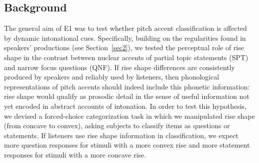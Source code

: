 \subsection{Background}\label{sec3200}
The general aim of E1 was to test whether pitch accent classification is affected by dynamic intonational cues. Specifically, building on the regularities found in speakers' productions (see Section~\ref{sec2}), we tested the perceptual role of rise shape in the contrast between nuclear accents of partial topic statements (SPT) and narrow focus questions (QNF). If rise shape differences are consistently produced by speakers and reliably used by listeners, then phonological representations of pitch accents should indeed include this phonetic information: rise shape would qualify as prosodic detail in the sense of useful information not yet encoded in abstract accounts of intonation. In order to test this hypothesis, we devised a forced-choice categorization task in which we manipulated rise shape (from concave to convex), asking subjects to classify items as questions or statements. If listeners use rise shape information in classification, we expect more question responses for stimuli with a more convex rise and more statement responses for stimuli with a more concave rise.

